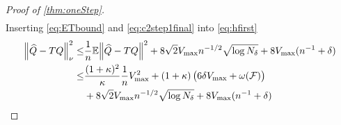 \begin{proof}[Proof of \cref{thm:oneStep}]
\begin{align}
    \label{eq:ETbound}
  \end{align}
  Inserting \cref{eq:ETbound} and \cref{eq:c2step1final} into \cref{eq:hfirst}
  \begin{align}
    \norm{\widehat{Q} - TQ}^2_\nu \leq & \frac{1}{n} \mathbb{E} \norm{\widehat{Q} - TQ}^2
    + 8 \sqrt{2} V_{\max} n^{-1/2} \sqrt{\log N_\delta}
    + 8 V_{\max} (n^{-1} + \delta)
    \\ \leq & \frac{(1+\kappa)^2}{\kappa} \frac{1}{n} V_{\max}^2
    + (1 + \kappa) \left( 6 \delta V_{\max}
    + \omega(\mathcal{F}) \right) 
    \notag
    \\ & + 8 \sqrt{2} V_{\max} n^{-1/2} \sqrt{\log N_\delta}
    + 8 V_{\max} (n^{-1} + \delta)
    \label{eq:C2final}
  \end{align}
\end{proof}



